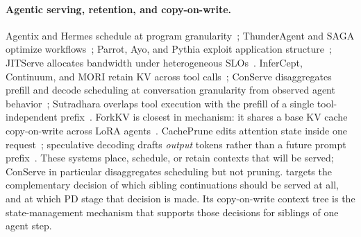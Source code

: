 \paragraph{Agentic serving, retention, and copy-on-write.}
Agentix and Hermes schedule at program granularity~\cite{autellix,hermes}; ThunderAgent and SAGA optimize workflows~\cite{thunderagent,saga}; Parrot, Ayo, and Pythia exploit application structure~\cite{parrot,ayo,pythia}; JITServe allocates bandwidth under heterogeneous SLOs~\cite{jitserve}.
InferCept, Continuum, and MORI retain KV across tool calls~\cite{infercept,continuum,mori}; ConServe disaggregates prefill and decode scheduling at conversation granularity from observed agent behavior~\cite{conserve}; Sutradhara overlaps tool execution with the prefill of a single tool-independent prefix~\cite{sutradhara}.
ForkKV is closest in mechanism: it shares a base KV cache copy-on-write across LoRA agents~\cite{forkkv}.
CachePrune edits attention state inside one request~\cite{cacheprune}; speculative decoding drafts \emph{output} tokens rather than a future prompt prefix~\cite{speculative,medusa,eagledraft}.
These systems place, schedule, or retain contexts that will be served; ConServe in particular disaggregates scheduling but not pruning.
\sys targets the complementary decision of which sibling continuations should be served at all, and at which PD stage that decision is made.
Its copy-on-write context tree is the state-management mechanism that supports those decisions for siblings of one agent step.

